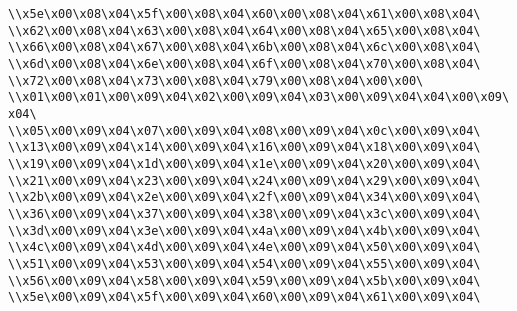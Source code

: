 \verb|\\x5e\x00\x08\x04\x5f\x00\x08\x04\x60\x00\x08\x04\x61\x00\x08\x04\|\newline
\verb|\\x62\x00\x08\x04\x63\x00\x08\x04\x64\x00\x08\x04\x65\x00\x08\x04\|\newline
\verb|\\x66\x00\x08\x04\x67\x00\x08\x04\x6b\x00\x08\x04\x6c\x00\x08\x04\|\newline
\verb|\\x6d\x00\x08\x04\x6e\x00\x08\x04\x6f\x00\x08\x04\x70\x00\x08\x04\|\newline
\verb|\\x72\x00\x08\x04\x73\x00\x08\x04\x79\x00\x08\x04\x00\x00\|\newline
\verb|\\x01\x00\x01\x00\x09\x04\x02\x00\x09\x04\x03\x00\x09\x04\x04\x00\x09\x04\|\newline
\verb|\\x05\x00\x09\x04\x07\x00\x09\x04\x08\x00\x09\x04\x0c\x00\x09\x04\|\newline
\verb|\\x13\x00\x09\x04\x14\x00\x09\x04\x16\x00\x09\x04\x18\x00\x09\x04\|\newline
\verb|\\x19\x00\x09\x04\x1d\x00\x09\x04\x1e\x00\x09\x04\x20\x00\x09\x04\|\newline
\verb|\\x21\x00\x09\x04\x23\x00\x09\x04\x24\x00\x09\x04\x29\x00\x09\x04\|\newline
\verb|\\x2b\x00\x09\x04\x2e\x00\x09\x04\x2f\x00\x09\x04\x34\x00\x09\x04\|\newline
\verb|\\x36\x00\x09\x04\x37\x00\x09\x04\x38\x00\x09\x04\x3c\x00\x09\x04\|\newline
\verb|\\x3d\x00\x09\x04\x3e\x00\x09\x04\x4a\x00\x09\x04\x4b\x00\x09\x04\|\newline
\verb|\\x4c\x00\x09\x04\x4d\x00\x09\x04\x4e\x00\x09\x04\x50\x00\x09\x04\|\newline
\verb|\\x51\x00\x09\x04\x53\x00\x09\x04\x54\x00\x09\x04\x55\x00\x09\x04\|\newline
\verb|\\x56\x00\x09\x04\x58\x00\x09\x04\x59\x00\x09\x04\x5b\x00\x09\x04\|\newline
\verb|\\x5e\x00\x09\x04\x5f\x00\x09\x04\x60\x00\x09\x04\x61\x00\x09\x04\|\newline
